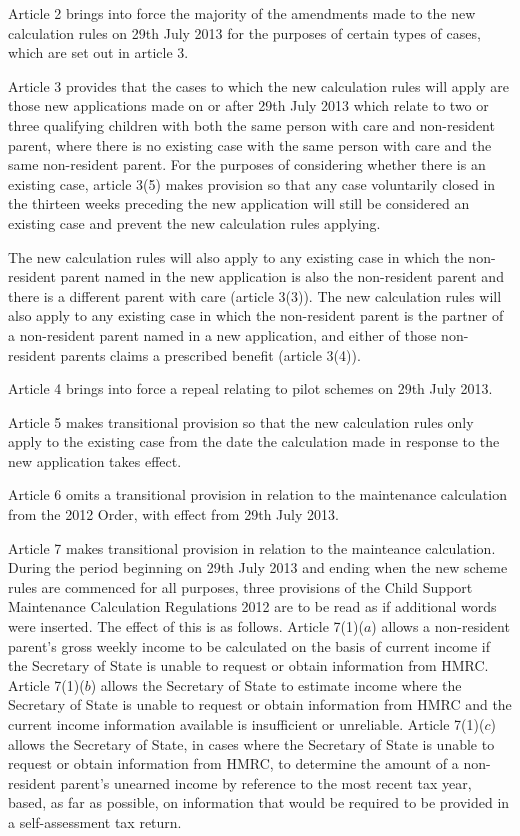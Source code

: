 \documentclass[12pt,a4paper]{article}
\begin{document}
Article 2 brings into force the majority of the amendments made to the new calculation rules on 29th July 2013 for the purposes of certain types of cases, which are set out in article 3.

Article 3 provides that the cases to which the new calculation rules will apply are those new applications made on or after 29th July 2013 which relate to two or three qualifying children with both the same person with care and non-resident parent, where there is no existing case with the same person with care and the same non-resident parent. For the purposes of considering whether there is an existing case, article 3(5) makes provision so that any case voluntarily closed in the thirteen weeks preceding the new application will still be considered an existing case and prevent the new calculation rules applying.

The new calculation rules will also apply to any existing case in which the non-resident parent named in the new application is also the non-resident parent and there is a different parent with care (article 3(3)). The new calculation rules will also apply to any existing case in which the non-resident parent is the partner of a non-resident parent named in a new application, and either of those non-resident parents claims a prescribed benefit (article 3(4)).

Article 4 brings into force a repeal relating to pilot schemes on 29th July 2013.

Article 5 makes transitional provision so that the new calculation rules only apply to the existing case from the date the calculation made in response to the new application takes effect.

Article 6 omits a transitional provision in relation to the maintenance calculation from the 2012 Order, with effect from 29th July 2013.

Article 7 makes transitional provision in relation to the mainteance calculation. During the period beginning on 29th July 2013 and ending when the new scheme rules are commenced for all purposes, three provisions of the Child Support Maintenance Calculation Regulations 2012 are to be read as if additional words were inserted. The effect of this is as follows. Article 7(1)($a$)  allows a non-resident parent’s gross weekly income to be calculated on the basis of current income if the Secretary of State is unable to request or obtain information from HMRC. Article 7(1)($b$)  allows the Secretary of State to estimate income where the Secretary of State is unable to request or obtain information from HMRC and the current income information available is insufficient or unreliable. Article 7(1)($c$)  allows the Secretary of State, in cases where the Secretary of State is unable to request or obtain information from HMRC, to determine the amount of a non-resident parent’s unearned income by reference to the most recent tax year, based, as far as possible, on information that would be required to be provided in a self-assessment tax return. 
\end{document}
